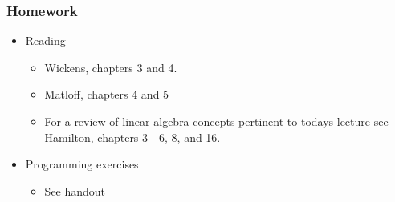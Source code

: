 \documentclass{beamer}
\begin{document}
\begin{frame}
  \frametitle{Homework}

\begin{itemize}
\item Reading

\begin{itemize}
 \item Wickens, chapters 3 and 4.
 \item Matloff, chapters 4 and 5
 \item For a review of linear algebra concepts pertinent to todays lecture see Hamilton, chapters 3 - 6, 8, and 16.
\end{itemize}

\item Programming exercises
\begin{itemize}
	\item See handout
\end{itemize}


\end{itemize}

\end{frame}
\end{document}
